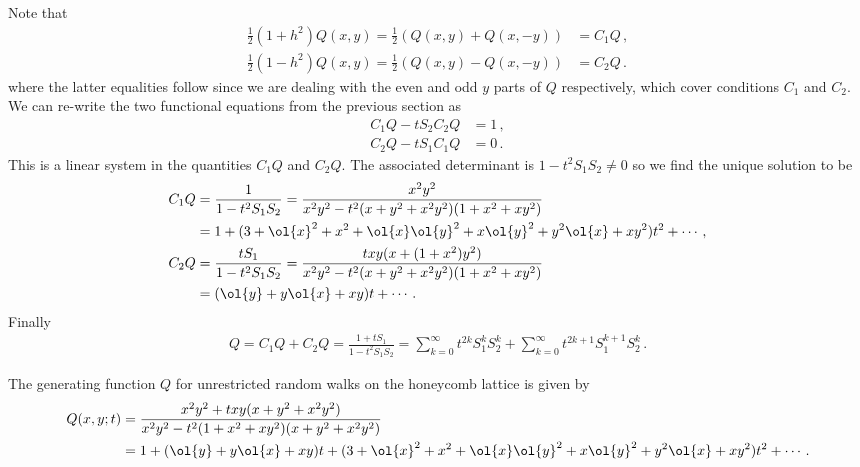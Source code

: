 Note that
\begin{align}
	\frac{1}{2}(1+h^2)Q(x,y) = \frac{1}{2}(Q(x,y)+Q(x,-y)) &= C_1 Q\,,\\
	\frac{1}{2}(1-h^2)Q(x,y) =  \frac{1}{2}(Q(x,y)-Q(x,-y)) &= C_2 Q\,.
\end{align}
where the latter equalities follow since we are dealing with the even and odd $y$ parts of $Q$ respectively, which cover conditions $C_1$ and $C_2$. We can re-write the two functional equations from the previous section as
\begin{align}
	C_1Q-tS_2C_2 Q &= 1\,,\\
	C_2Q-tS_1C_1Q &= 0\,.
\end{align}
This is a linear system in the quantities $C_1Q$ and $C_2 Q$. The associated determinant is $1-t^2S_1S_2 \neq 0$ so we find the unique solution to be
\begin{align}
	C_1Q &= \frac{1}{1-t^2S_1S_2} = \frac{x^2y^2}{x^2y^2-t^2(x+y^2+x^2y^2)(1+x^2+xy^2)}\\
		&= 1 + (3+\ol{x}^2+x^2+\ol{x}\ol{y}^2+x\ol{y}^2+y^2\ol{x}+xy^2)t^2 + \cdots\,,\\
	 C_2Q &= \frac{t S_1}{1-t^2 S_1S_2} = \frac{txy(x+(1+x^2)y^2)}{x^2y^2-t^2(x+y^2+x^2y^2)(1+x^2+xy^2)}\\
		 &= (\ol{y}+y\ol{x}+xy)t + \cdots\,.
\end{align}
Finally
\begin{align}
	Q = C_1 Q + C_2 Q = \frac{1+tS_1}{1-t^2 S_1S_2} = \sum_{k=0}^{\infty} t^{2k} S_1^k S_2^k +\sum_{k=0}^{\infty} t^{2k+1} S_1^{k+1} S_2^k\,.
\end{align}
\begin{prop} The generating function $Q$ for unrestricted random walks on the honeycomb lattice is given by
\begin{align}
	Q(x,y;t) &= \frac{x^2y^2+txy(x+y^2+x^2y^2)}{x^2y^2-t^2(1+x^2+xy^2)(x+y^2+x^2y^2)}\\
		&= 1  + (\ol{y}+y\ol{x}+xy)t + (3+\ol{x}^2+x^2+\ol{x}\ol{y}^2+x\ol{y}^2+y^2\ol{x}+xy^2)t^2 + \cdots\,.
\end{align}
\end{prop}

\endinput
